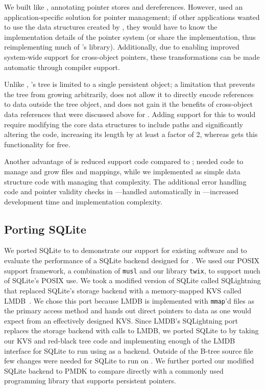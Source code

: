 We built \nvrbt like \unixrbt, annotating pointer stores and
dereferences. However, \unixrbt used an application-specific solution for pointer
management; if other applications wanted to use the data structures created by \unixrbt, they would
have to know the implementation details of the pointer system (or share the implementation, thus
reimplementing much of \Twizzler's library).  Additionally, due to \Twizzler enabling improved
system-wide support for cross-object pointers, these transformations can be made automatic through
compiler support.

Unlike \nvrbt, \unixrbt's tree is limited to a single persistent
object; a limitation that prevents the tree from growing arbitrarily, does not
allow it to directly encode references to data outside the tree object, and does
not gain it the benefits of cross-object data references that were discussed
above for \nvkv. Adding support for this to \unixrbt would require modifying the
core data structures to include paths and significantly altering the code,
increasing its length by at least a factor of 2, whereas \nvrbt gets this
functionality for free.

Another advantage of \nvrbt is reduced support code compared to \unixrbt; \unixrbt needed
code to manage and grow files and mappings, while we implemented \nvrbt as simple data structure code
with \Twizzler managing that complexity. The additional error handling code and pointer
validity checks in \unixrbt---handled automatically in \Twizzler---increased development time
and implementation complexity.


\subsection{Porting SQLite}

We ported SQLite to \Twizzler to demonstrate our support for existing software and to evaluate the
performance of a SQLite backend designed for \Twizzler. We used
our POSIX support framework, a combination of \texttt{musl} and our library
\texttt{twix}, to support much of SQLite's POSIX use.
We took a modified version of SQLite called SQLightning that replaced
SQLite's storage backend with a memory-mapped KVS called LMDB~\cite{lmdb}.
We chose this port
because LMDB is implemented with \texttt{mmap}'d files as the primary access method and hands out
direct pointers to data as one would expect from an effectively designed \NVM KVS.
Since LMDB's SQLightning port replaces the storage backend
with calls to
LMDB, we ported SQLite to \Twizzler by taking our KVS and red-black tree code and implementing
enough of the LMDB interface for SQLite to run using \Twizzler as a backend.
Outside of the
B-tree source file few changes were needed for
SQLite to run on \Twizzler. We further ported our modified SQLite backend to PMDK to compare
directly with a commonly used \NVM programming library that supports persistent pointers.

